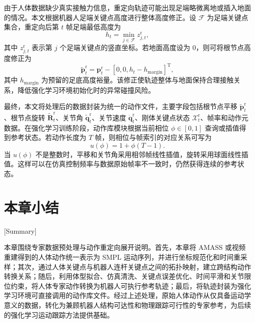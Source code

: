 由于人体数据缺少真实接触力信息，重定向轨迹可能出现足端略微离地或插入地面的情况。本文根据机器人足端关键点高度进行整体高度修正。设 $\mathcal{F}$ 为足端关键点集合，重定向后第 $t$ 帧足端最低高度为
\begin{equation}
h_t
=
\min_{j\in\mathcal{F}}
z^{\mathrm{r}}_{j,t},
\end{equation}
其中 $z^{\mathrm{r}}_{j,t}$ 表示第 $j$ 个足端关键点的竖直坐标。若地面高度设为 $0$，则可将根节点高度修正为
\begin{equation}
\tilde{\boldsymbol{p}}^{\mathrm{r}}_t
=
\boldsymbol{p}^{\mathrm{r}}_t
-
\left[0,0,h_t-h_{\mathrm{margin}}\right]^{\mathrm{T}},
\end{equation}
其中 $h_{\mathrm{margin}}$ 为预留的足底高度裕量。该修正使轨迹整体与地面保持合理接触关系，降低强化学习环境初始化时的异常碰撞风险。

最终，本文将处理后的数据封装为统一的动作文件，主要字段包括根节点平移 $\tilde{\boldsymbol{p}}^{\mathrm{r}}_t$、根节点旋转 $\tilde{\boldsymbol{R}}^{\mathrm{r}}_t$、关节角 $\tilde{\boldsymbol{q}}^{\mathrm{r}}_t$、关节速度 $\dot{\boldsymbol{q}}^{\mathrm{r}}_t$、刚体关键点状态 $\mathcal{X}^{\mathrm{r}}_t$、帧率和动作元数据。在强化学习训练阶段，动作库模块根据当前相位 $\phi\in[0,1]$ 查询或插值得到参考状态。若动作长度为 $T$ 帧，则相位与帧索引的对应关系可写为
\begin{equation}
u(\phi)=1+\phi(T-1).
\end{equation}
当 $u(\phi)$ 不是整数时，平移和关节角采用相邻帧线性插值，旋转采用球面线性插值。这样可以在仿真控制频率与数据原始帧率不一致时，仍然获得连续的参考状态。




\section{本章小结}[Summary]

本章围绕专家数据预处理与动作重定向展开说明。首先，本章将 AMASS 或视频重建得到的人体动作统一表示为 SMPL 运动序列，并进行坐标规范化和时间重采样；其次，通过人体关键点与机器人连杆关键点之间的拓扑映射，建立跨结构动作转换关系；随后，利用体型拟合、仿真清洗、关键点误差优化、时间平滑和关节限位约束，将人体专家动作转换为机器人可执行参考轨迹；最后，将轨迹封装为强化学习环境可直接调用的动作库文件。经过上述处理，原始人体动作从仅具备运动学意义的数据，转化为兼顾机器人结构可达性和物理跟踪可行性的专家参考，为后续的强化学习运动跟踪方法提供基础。
